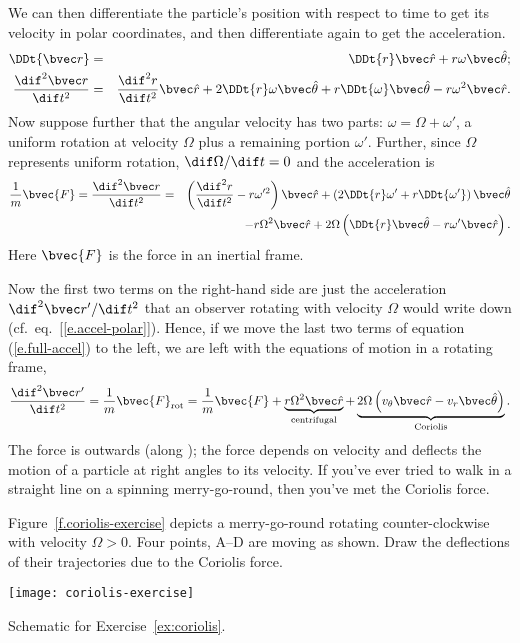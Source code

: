 We can then differentiate the particle's position with respect to time to get its velocity in polar coordinates, and then differentiate again to get the acceleration.
\begin{eqnarray}
\DDt{\rv} &=& \DDt{r}\rhat + r\omega\thetahat; \\
\DDtt{\rv} &=& \DDtt{r}\rhat + 2\DDt{r}\omega\thetahat + r \DDt{\omega}\thetahat - r\omega^{2}\rhat.
\label{e.accel-polar}
\end{eqnarray}
Now suppose further that the angular velocity has two parts: $\omega = \Omega+\omega'$, a uniform rotation at velocity $\Omega$ plus a remaining portion $\omega'$.  Further, since $\Omega$ represents uniform rotation, $\dif\Omega/\dif t = 0$ and the acceleration is
\begin{eqnarray}
\frac{1}{m}\bvec{F} = \DDtt{\rv} &=& \left(\DDtt{r} - r\omega'^{2}\right)\rhat + \left(2\DDt{r}\omega' + r\DDt{\omega'}\right)\thetahat\nonumber\\
 && -r\Omega^{2}\rhat + 2\Omega\left(\DDt{r}\thetahat - r\omega'\rhat\right).
\label{e.full-accel}
\end{eqnarray}
Here $\bvec{F}$ is the force in an inertial frame.

Now the first two terms on the right-hand side are just the acceleration $\dif^{2}\rv'/\dif t^{2}$ that an observer rotating with velocity $\Omega$ would write down (cf.\ eq.~[\ref{e.accel-polar}]).  Hence, if we move the last two terms of equation (\ref{e.full-accel}) to the left, we are left with the equations of motion in a rotating frame,
\begin{equation}\label{e.motion-rotating}
\DDtt{\rv'} = \frac{1}{m}\bvec{F}_{\mathrm{rot}} = \frac{1}{m}\bvec{F} 
	+  \underbrace{r\Omega^{2}\rhat}_{\textrm{centrifugal}}
	+	\underbrace{2\Omega\left(v_{\theta}\rhat - v_{r}\thetahat \right)}_{\textrm{Coriolis}}.
\end{equation}
The  force is outwards (along \rhat); the  force depends on velocity and deflects the motion of a particle at right angles to its velocity.  If you've ever tried to walk in a straight line on a spinning merry-go-round, then you've met the Coriolis force.

\begin{exercisebox}
\label{ex:coriolis}
Figure~\ref{f.coriolis-exercise} depicts a merry-go-round rotating counter-clockwise with velocity $\Omega > 0$.  Four points, A--D are moving as shown.  Draw the deflections of their trajectories due to the Coriolis force.
\end{exercisebox}
\begin{marginfigure}
\texttt{[image: coriolis-exercise]}
\caption[Movement on a merry-go-round]{Schematic for Exercise~\ref{ex:coriolis}.
\label{f.coriolis-exercise}}
\end{marginfigure}

